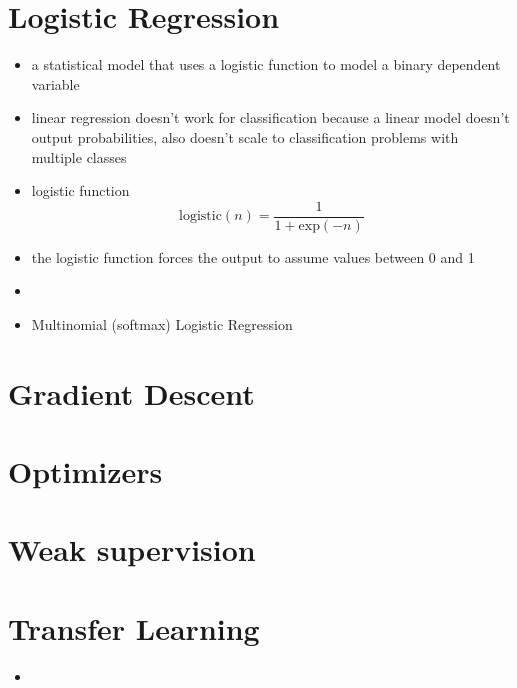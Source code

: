 \documentclass[../main.tex]{subfiles}
\begin{document}
\section{Logistic Regression}
  \begin{itemize}
    \item a statistical model that uses a logistic function to model a binary dependent variable
    \item linear regression doesn't work for classification because a linear model doesn't output probabilities, also doesn't scale to classification problems with multiple classes
    \item logistic function
    \begin{equation*}
      \text{logistic}{(n)} = \frac{1}{1 + \text{exp}(-n)}
    \end{equation*}
    \item the logistic function forces the output to assume values between 0 and 1
    \item
    \item Multinomial (softmax) Logistic Regression
  \end{itemize}

\section{Gradient Descent}

\section{Optimizers}

\section{Weak supervision}

\section{Transfer Learning}
\begin{itemize}
  \item
\end{itemize}
\end{document}
